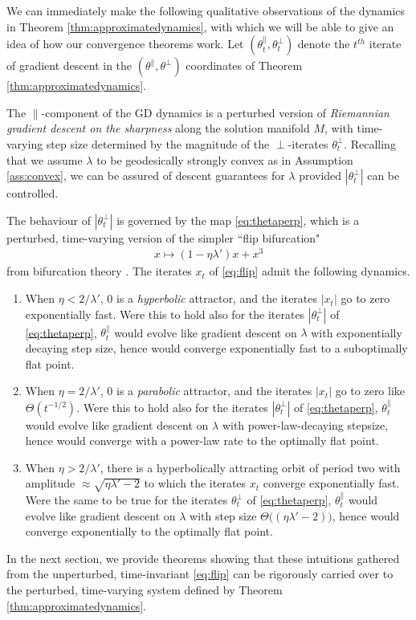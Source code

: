 \documentclass{article}
\newcommand{\tpa}{\theta^{\parallel}}
\newcommand{\tpe}{\theta^{\perp}}
\theoremstyle{plain}
\theoremstyle{definition}
\theoremstyle{remark}
\begin{document}
We can immediately make the following qualitative observations of the dynamics in Theorem \ref{thm:approximatedynamics}, with which we will be able to give an idea of how our convergence theorems work. Let $(\tpa_t,\tpe_t)$ denote the $t^{th}$ iterate of gradient descent in the $(\tpa,\tpe)$ coordinates of Theorem \ref{thm:approximatedynamics}.

The $\parallel$-component of the GD dynamics is a perturbed version of \emph{Riemannian gradient descent on the sharpness} along the solution manifold $M$, with time-varying step size determined by the magnitude of the $\perp$-iterates $\tpe_t$. Recalling that we assume $\lambda$ to be geodesically strongly convex as in Assumption \ref{ass:convex}, we can be assured of descent guarantees for $\lambda$ provided $|\tpe_t|$ can be controlled.

The behaviour of $|\tpe_t|$ is governed by the map \eqref{eq:thetaperp}, which is a perturbed, time-varying version of the simpler ``flip bifurcation"
\begin{align}
    x\mapsto (1-\eta\lambda')x + x^3\label{eq:flip}
\end{align}
from bifurcation theory \cite{kuznetsov}. The iterates $x_t$ of \eqref{eq:flip} admit the following dynamics.
\begin{enumerate}
    \item When $\eta<2/\lambda'$, $0$ is a \emph{hyperbolic} attractor, and the iterates $|x_t|$ go to zero exponentially fast. Were this to hold also for the iterates $|\tpe_t|$ of \eqref{eq:thetaperp}, $\tpa_t$ would evolve like gradient descent on $\lambda$ with exponentially decaying step size, hence would converge exponentially fast to a suboptimally flat point.
    \item When $\eta = 2/\lambda'$, $0$ is a \emph{parabolic} attractor, and the iterates $|x_t|$ go to zero like $\Theta(t^{-1/2})$. Were this to hold also for the iterates $|\tpe_t|$ of \eqref{eq:thetaperp}, $\tpa_t$ would evolve like gradient descent on $\lambda$ with power-law-decaying stepsize, hence would converge with a power-law rate to the optimally flat point.
    \item When $\eta>2/\lambda'$, there is a hyperbolically attracting orbit of period two with amplitude $\approx \sqrt{\eta\lambda'-2}$ to which the iterates $x_t$ converge exponentially fast. Were the same to be true for the iterates $\tpe_t$ of \eqref{eq:thetaperp}, $\tpa_t$ would evolve like gradient descent on $\lambda$ with step size $\Theta\big((\eta\lambda'-2)\big)$, hence would converge exponentially to the optimally flat point.
\end{enumerate}
In the next section, we provide theorems showing that these intuitions gathered from the unperturbed, time-invariant \eqref{eq:flip} can be rigorously carried over to the perturbed, time-varying system defined by Theorem \ref{thm:approximatedynamics}.
\end{document}
